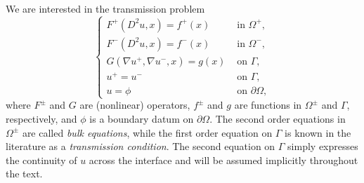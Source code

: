 \documentclass[letter,11pt]{amsart}
\theoremstyle{definition}
\numberwithin{equation}{section}
\begin{document}
\medskip

We are interested in the transmission problem
\begin{equation}
\label{gen:dirichlet}
\begin{cases}
F^{+}(D^2u, x) = f^{+}(x) & \text{ in } \Omega^{+},\\
F^{-}(D^2u, x) = f^{-}(x) & \text{ in } \Omega^{-},\\
G(\nabla u^{+}, \nabla u^{-}, x) =g(x) & \text{ on } \Gamma,\\
u^{+} = u^{-} & \text{ on } \Gamma,\\
u = \phi & \text{ on } \partial \Omega,
\end{cases}
\end{equation}
where $F^{\pm}$ and $G$ are (nonlinear) operators, $f^{\pm}$ and $g$ are functions in $\Omega^{\pm}$ and $\Gamma$, respectively, and $\phi$ is a boundary datum on $\partial \Omega$.
The second order equations in $\Omega^{\pm}$ are called \emph{bulk equations}, while the first order equation on $\Gamma$ is known in the literature as a \emph{transmission condition}.
The second equation on $\Gamma$ simply expresses the continuity of $u$ across the interface and will be assumed implicitly throughout the text.

\medskip
\end{document}
